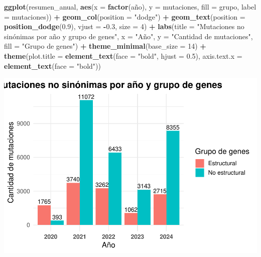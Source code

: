 \documentclass[
]{article}
\newenvironment{Shaded}{\begin{snugshade}}{\end{snugshade}}
\newcommand{\AttributeTok}[1]{\textcolor[rgb]{0.13,0.29,0.53}{#1}}
\newcommand{\DecValTok}[1]{\textcolor[rgb]{0.00,0.00,0.81}{#1}}
\newcommand{\FloatTok}[1]{\textcolor[rgb]{0.00,0.00,0.81}{#1}}
\newcommand{\FunctionTok}[1]{\textcolor[rgb]{0.13,0.29,0.53}{\textbf{#1}}}
\newcommand{\NormalTok}[1]{#1}
\newcommand{\SpecialCharTok}[1]{\textcolor[rgb]{0.81,0.36,0.00}{\textbf{#1}}}
\newcommand{\StringTok}[1]{\textcolor[rgb]{0.31,0.60,0.02}{#1}}
\begin{document}
\begin{Shaded}
\begin{Highlighting}[]
\FunctionTok{ggplot}\NormalTok{(resumen\_anual, }\FunctionTok{aes}\NormalTok{(}\AttributeTok{x =} \FunctionTok{factor}\NormalTok{(año), }\AttributeTok{y =}\NormalTok{ mutaciones, }\AttributeTok{fill =}\NormalTok{ grupo, }\AttributeTok{label =}\NormalTok{ mutaciones)) }\SpecialCharTok{+}
  \FunctionTok{geom\_col}\NormalTok{(}\AttributeTok{position =} \StringTok{"dodge"}\NormalTok{) }\SpecialCharTok{+}
  \FunctionTok{geom\_text}\NormalTok{(}\AttributeTok{position =} \FunctionTok{position\_dodge}\NormalTok{(}\FloatTok{0.9}\NormalTok{), }\AttributeTok{vjust =} \SpecialCharTok{{-}}\FloatTok{0.3}\NormalTok{, }\AttributeTok{size =} \DecValTok{4}\NormalTok{) }\SpecialCharTok{+}
  \FunctionTok{labs}\NormalTok{(}\AttributeTok{title =} \StringTok{"Mutaciones no sinónimas por año y grupo de genes"}\NormalTok{,}
       \AttributeTok{x =} \StringTok{"Año"}\NormalTok{, }\AttributeTok{y =} \StringTok{"Cantidad de mutaciones"}\NormalTok{, }\AttributeTok{fill =} \StringTok{"Grupo de genes"}\NormalTok{) }\SpecialCharTok{+}
  \FunctionTok{theme\_minimal}\NormalTok{(}\AttributeTok{base\_size =} \DecValTok{14}\NormalTok{) }\SpecialCharTok{+}
  \FunctionTok{theme}\NormalTok{(}\AttributeTok{plot.title =} \FunctionTok{element\_text}\NormalTok{(}\AttributeTok{face =} \StringTok{"bold"}\NormalTok{, }\AttributeTok{hjust =} \FloatTok{0.5}\NormalTok{),}
        \AttributeTok{axis.text.x =} \FunctionTok{element\_text}\NormalTok{(}\AttributeTok{face =} \StringTok{"bold"}\NormalTok{))}
\end{Highlighting}
\end{Shaded}

\includegraphics{situacion_problema_files/figure-latex/unnamed-chunk-6-1.pdf}
\end{document}
